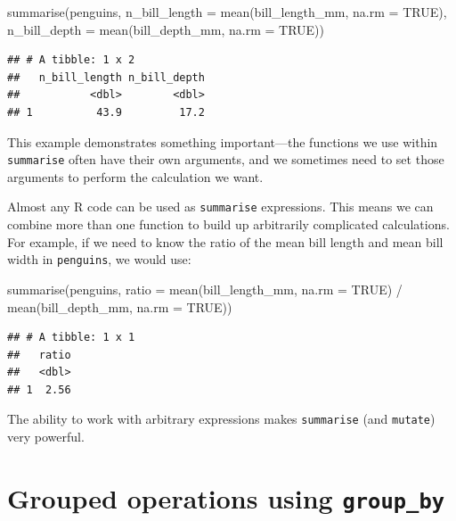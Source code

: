 \documentclass[
]{book}
\newenvironment{Shaded}{\begin{snugshade}}{\end{snugshade}}
\newcommand{\AttributeTok}[1]{\textcolor[rgb]{0.77,0.63,0.00}{#1}}
\newcommand{\ConstantTok}[1]{\textcolor[rgb]{0.00,0.00,0.00}{#1}}
\newcommand{\FunctionTok}[1]{\textcolor[rgb]{0.00,0.00,0.00}{#1}}
\newcommand{\NormalTok}[1]{#1}
\newcommand{\SpecialCharTok}[1]{\textcolor[rgb]{0.00,0.00,0.00}{#1}}
\begin{document}
\begin{Shaded}
\begin{Highlighting}[]
\FunctionTok{summarise}\NormalTok{(penguins, }
          \AttributeTok{n\_bill\_length =} \FunctionTok{mean}\NormalTok{(bill\_length\_mm, }\AttributeTok{na.rm =} \ConstantTok{TRUE}\NormalTok{), }
          \AttributeTok{n\_bill\_depth  =} \FunctionTok{mean}\NormalTok{(bill\_depth\_mm,  }\AttributeTok{na.rm =} \ConstantTok{TRUE}\NormalTok{))}
\end{Highlighting}
\end{Shaded}

\begin{verbatim}
## # A tibble: 1 x 2
##   n_bill_length n_bill_depth
##           <dbl>        <dbl>
## 1          43.9         17.2
\end{verbatim}

This example demonstrates something important---the functions we use within \texttt{summarise} often have their own arguments, and we sometimes need to set those arguments to perform the calculation we want.

Almost any R code can be used as \texttt{summarise} expressions. This means we can combine more than one function to build up arbitrarily complicated calculations. For example, if we need to know the ratio of the mean bill length and mean bill width in \texttt{penguins}, we would use:

\begin{Shaded}
\begin{Highlighting}[]
\FunctionTok{summarise}\NormalTok{(penguins,}
  \AttributeTok{ratio =} \FunctionTok{mean}\NormalTok{(bill\_length\_mm, }\AttributeTok{na.rm =} \ConstantTok{TRUE}\NormalTok{) }\SpecialCharTok{/} \FunctionTok{mean}\NormalTok{(bill\_depth\_mm,  }\AttributeTok{na.rm =} \ConstantTok{TRUE}\NormalTok{))}
\end{Highlighting}
\end{Shaded}

\begin{verbatim}
## # A tibble: 1 x 1
##   ratio
##   <dbl>
## 1  2.56
\end{verbatim}

The ability to work with arbitrary expressions makes \texttt{summarise} (and \texttt{mutate}) very powerful.

\hypertarget{grouped-operations-using-group_by}{%
\section{\texorpdfstring{Grouped operations using \texttt{group\_by}}{Grouped operations using group\_by}}\label{grouped-operations-using-group_by}}
\end{document}
